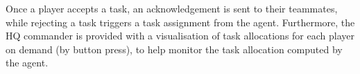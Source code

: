 Once a player accepts a task, an acknowledgement is sent to their teammates, while rejecting a task triggers a task assignment from the agent. Furthermore, the HQ commander is provided with a visualisation of task allocations for each player on demand (by button press), to help monitor the task allocation computed by the agent.

